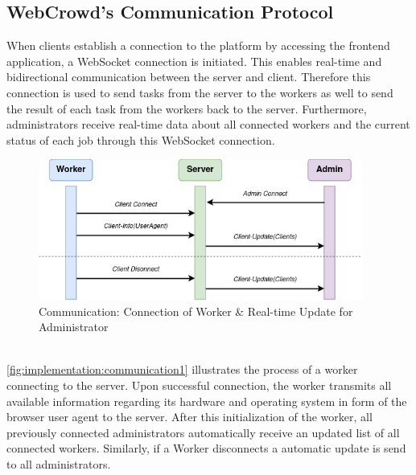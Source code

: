 \subsection{WebCrowd's Communication Protocol}
\label{subsec:implementation:architecture:communication}
When clients establish a connection to the platform by accessing the frontend application, a WebSocket connection is initiated. This enables real-time and bidirectional communication between the server and client. Therefore this connection is used to send tasks from the server to the workers as well to send the result of each task from the workers back to the server. Furthermore, administrators receive real-time data about all connected workers and the current status of each job through this WebSocket connection.
\begin{figure}[htbp]
    \centering
    \includegraphics[width=0.95\textwidth]{gfx/figures/communication-connection.png}
    \caption{Communication: Connection of Worker \& Real-time Update for Administrator}
    \label{fig:implementation:communication1}
\end{figure}
~\\
\autoref{fig:implementation:communication1} illustrates the process of a worker connecting to the server. Upon successful connection, the worker transmits all available information regarding its hardware and operating system in form of the browser user agent to the server. After this initialization of the worker, all previously connected administrators automatically receive an updated list of all connected workers. Similarly, if a Worker disconnects a automatic update is send to all administrators.
